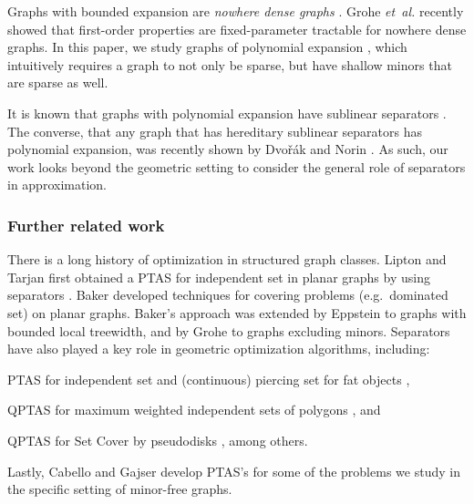 \documentclass[12pt]{article}
\newcommand{\etal}{\textit{et~al.}\xspace}
\newcommand{\Term}[1]{\textsf{#1}}
\theoremstyle{remark}\theoremheaderfont{\sf}\theorembodyfont{\upshape}
\numberwithin{figure}{section}\numberwithin{table}{section}\numberwithin{equation}{section}
\newcommand{\ProblemC}[1]{\textsf{#1}}
\newcommand{\PTAS}{\Term{PTAS}\xspace}
\newcommand{\QPTAS}{\Term{QPTAS}\xspace}
\begin{document}
Graphs with bounded expansion are \emph{nowhere dense graphs}
\cite[Section 5.4]{no-s-12}. Grohe \etal \cite{gks-dfopndg-14}
recently showed that first-order properties are fixed-parameter
tractable for nowhere dense graphs. In this paper, we study graphs of
polynomial expansion \cite[Section 5.5]{no-s-12}, which intuitively
requires a graph to not only be sparse, but have shallow minors that
are sparse as well.

It is known that graphs with polynomial expansion have sublinear
separators \cite{no-gcbe1-08}. The converse, that any graph that has
hereditary sublinear separators has polynomial expansion, was recently
shown by Dvo{\v{r}}{\'{a}}k and Norin \cite{dn-ssspe-15}. As such, our
work looks beyond the geometric setting to consider the general role
of separators in approximation.


\subsubsection{Further related work}

There is a long history of optimization in structured graph
classes. Lipton and Tarjan first obtained a \PTAS for independent set
in planar graphs by using separators
\cite{lt-stpg-79,lt-apst-80}. Baker \cite{b-aancp-94} developed
techniques for covering problems (e.g.\ dominated set) on planar
graphs. Baker's approach was extended by Eppstein \cite{e-dtmcg-00} to
graphs with bounded local treewidth, and by Grohe \cite{g-ltwem-03} to
graphs excluding minors. Separators have also played a key role in
geometric optimization algorithms, including:
\begin{inparaenum}[(i)]
\item \PTAS for independent set and (continuous) piercing set for fat
  objects \cite{c-ptasp-03, mr-irghs-10},
\item \QPTAS for maximum weighted independent sets of polygons
  \cite{aw-asmwi-13,aw-qmwis-14,h-qssp-14}, and
\item \QPTAS for \ProblemC{Set Cover} by pseudodisks
  \cite{mrr-qgscp-14}, among others.
\end{inparaenum}
Lastly, Cabello and Gajser \cite{cg-spfgem-14} develop \PTAS{}'s for
some of the problems we study in the specific setting of minor-free
graphs.
\end{document}
